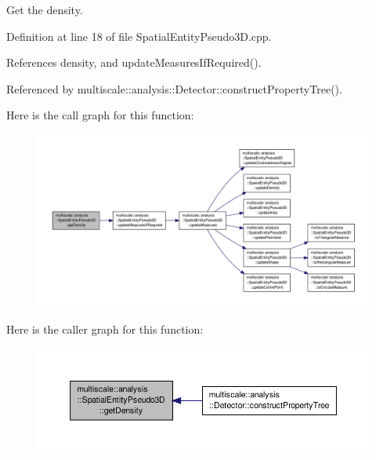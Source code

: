 Get the density. 



Definition at line 18 of file Spatial\-Entity\-Pseudo3\-D.\-cpp.



References density, and update\-Measures\-If\-Required().



Referenced by multiscale\-::analysis\-::\-Detector\-::construct\-Property\-Tree().



Here is the call graph for this function\-:
\nopagebreak
\begin{figure}[H]
\begin{center}
\leavevmode
\includegraphics[width=350pt]{classmultiscale_1_1analysis_1_1SpatialEntityPseudo3D_a98a29584b604d113db53e7009fd3cb79_cgraph}
\end{center}
\end{figure}




Here is the caller graph for this function\-:
\nopagebreak
\begin{figure}[H]
\begin{center}
\leavevmode
\includegraphics[width=350pt]{classmultiscale_1_1analysis_1_1SpatialEntityPseudo3D_a98a29584b604d113db53e7009fd3cb79_icgraph}
\end{center}
\end{figure}



